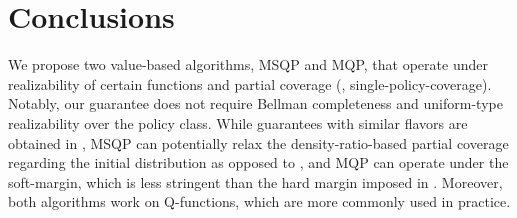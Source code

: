 \section{Conclusions}
 \vspace{-0.2cm}

We propose two value-based algorithms, MSQP and MQP, that operate under realizability of certain functions and partial coverage (\ie, single-policy-coverage). Notably, our guarantee does not require Bellman completeness and uniform-type realizability over the policy class. While guarantees with similar flavors are obtained in \citet{zhan2022offline,chen2022offline}, MSQP can potentially relax the density-ratio-based partial coverage regarding the initial distribution as opposed to \citet{zhan2022offline}, and MQP can operate under the soft-margin, which is less stringent than the hard margin imposed in \citet{chen2022offline}. Moreover, both algorithms work on Q-functions, which are more commonly used in practice.
